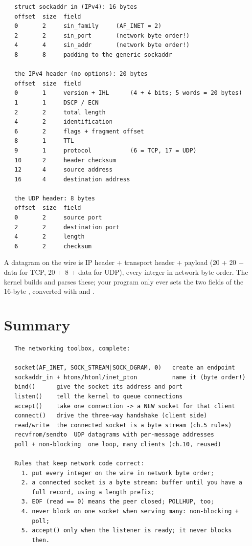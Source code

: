 \begin{verbatim}
   struct sockaddr_in (IPv4): 16 bytes
   offset  size  field
   0       2     sin_family     (AF_INET = 2)
   2       2     sin_port       (network byte order!)
   4       4     sin_addr       (network byte order!)
   8       8     padding to the generic sockaddr

   the IPv4 header (no options): 20 bytes
   offset  size  field
   0       1     version + IHL      (4 + 4 bits; 5 words = 20 bytes)
   1       1     DSCP / ECN
   2       2     total length
   4       2     identification
   6       2     flags + fragment offset
   8       1     TTL
   9       1     protocol           (6 = TCP, 17 = UDP)
   10      2     header checksum
   12      4     source address
   16      4     destination address

   the UDP header: 8 bytes
   offset  size  field
   0       2     source port
   2       2     destination port
   4       2     length
   6       2     checksum
\end{verbatim}

A datagram on the wire is IP header + transport header + payload
(20 + 20 + data for TCP, 20 + 8 + data for UDP), every integer in
network byte order. The kernel builds and parses these; your program
only ever sets the two fields of the 16-byte ,
converted with  and .

\section{Summary}

\begin{verbatim}
   The networking toolbox, complete:

   socket(AF_INET, SOCK_STREAM|SOCK_DGRAM, 0)   create an endpoint
   sockaddr_in + htons/htonl/inet_pton          name it (byte order!)
   bind()      give the socket its address and port
   listen()    tell the kernel to queue connections
   accept()    take one connection -> a NEW socket for that client
   connect()   drive the three-way handshake (client side)
   read/write  the connected socket is a byte stream (ch.5 rules)
   recvfrom/sendto  UDP datagrams with per-message addresses
   poll + non-blocking  one loop, many clients (ch.10, reused)

   Rules that keep network code correct:
     1. put every integer on the wire in network byte order;
     2. a connected socket is a byte stream: buffer until you have a
        full record, using a length prefix;
     3. EOF (read == 0) means the peer closed; POLLHUP, too;
     4. never block on one socket when serving many: non-blocking +
        poll;
     5. accept() only when the listener is ready; it never blocks
        then.
\end{verbatim}

